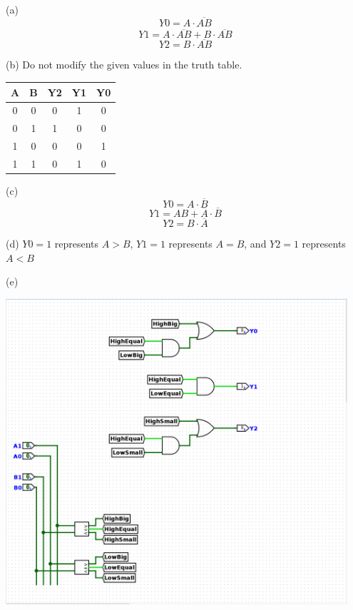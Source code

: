\documentclass[a4paper]{article}
\begin{document}
\begin{answer}[Question 1]
    (a)
    $$Y0 = A \cdot \overline{AB}$$
    $$Y1 = \overline{A \cdot \overline{AB} + B \cdot \overline{AB}}$$
    $$Y2 = B \cdot \overline{AB}$$

    (b) Do not modify the given values in the truth table.\\
    \begin{center}
        \begin{tabular}{ |c|c||c|c|c| }
            \hline
            A & B & Y2 & Y1 & Y0 \\
            \hline
            0 & 0 & 0  & 1  & 0  \\
            \hline
            0 & 1 & 1  & 0  & 0  \\
            \hline
            1 & 0 & 0  & 0  & 1  \\
            \hline
            1 & 1 & 0  & 1  & 0  \\
            \hline
        \end{tabular}
    \end{center}

    (c)
    $$Y0 = A \cdot \overline{B}$$
    $$Y1 = AB + \overline{A} \cdot \overline{B}$$
    $$Y2 = B \cdot \overline{A}$$

    (d) $Y0=1$ represents $A>B$, $Y1=1$ represents $A=B$, and $Y2=1$ represents $A<B$

    (e)

    \includegraphics[width=0.95\textwidth]{Q1_comparator_2.png}


\end{answer}
\end{document}
